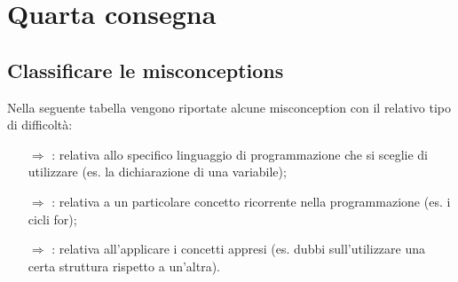 \chapter{Quarta consegna}

\section{Classificare le misconceptions}

Nella seguente tabella vengono riportate alcune
misconception con il relativo tipo di difficoltà:

\begin{itemize}
    \item [$\Rightarrow$] : relativa allo specifico
    linguaggio di programmazione che si sceglie di utilizzare (es. la dichiarazione di una variabile);
    \item [$\Rightarrow$] : relativa a un particolare concetto
    ricorrente nella programmazione (es. i cicli for);
    \item [$\Rightarrow$] : relativa all'applicare i concetti appresi 
    (es. dubbi sull'utilizzare una certa struttura rispetto a un'altra).
\end{itemize}

